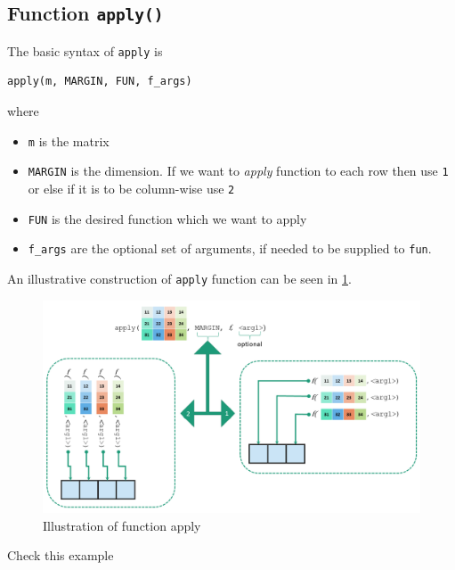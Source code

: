 \documentclass[
]{book}
\providecommand{\tightlist}{%
  \setlength{\itemsep}{0pt}\setlength{\parskip}{0pt}}
\begin{document}
\hypertarget{function-apply}{%
\subsection{\texorpdfstring{Function \texttt{apply()}}{Function apply()}}\label{function-apply}}

The basic syntax of \texttt{apply} is

\begin{verbatim}
apply(m, MARGIN, FUN, f_args)
\end{verbatim}

where

\begin{itemize}
\tightlist
\item
  \texttt{m} is the matrix
\item
  \texttt{MARGIN} is the dimension. If we want to \emph{apply} function to each row then use \texttt{1} or else if it is to be column-wise use \texttt{2}
\item
  \texttt{FUN} is the desired function which we want to apply
\item
  \texttt{f\_args} are the optional set of arguments, if needed to be supplied to \texttt{fun}.
\end{itemize}

An illustrative construction of \texttt{apply} function can be seen in \ref{fig:applyimage}.

\begin{figure}

{\centering \includegraphics[width=1\linewidth]{images/apply} 

}

\caption{Illustration of function apply}\label{fig:applyimage}
\end{figure}

Check this example
\end{document}
